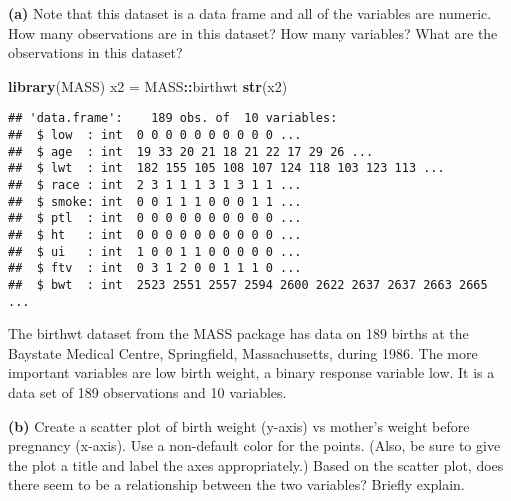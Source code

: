 \documentclass[]{article}
\newenvironment{Shaded}{\begin{snugshade}}{\end{snugshade}}
\newcommand{\DataTypeTok}[1]{\textcolor[rgb]{0.13,0.29,0.53}{#1}}
\newcommand{\KeywordTok}[1]{\textcolor[rgb]{0.13,0.29,0.53}{\textbf{#1}}}
\newcommand{\NormalTok}[1]{#1}
\newcommand{\OperatorTok}[1]{\textcolor[rgb]{0.81,0.36,0.00}{\textbf{#1}}}
\newcommand{\StringTok}[1]{\textcolor[rgb]{0.31,0.60,0.02}{#1}}
\begin{document}
\textbf{(a)} Note that this dataset is a data frame and all of the
variables are numeric. How many observations are in this dataset? How
many variables? What are the observations in this dataset?

\begin{Shaded}
\begin{Highlighting}[]
\KeywordTok{library}\NormalTok{(MASS)}
\NormalTok{x2 =}\StringTok{ }\NormalTok{MASS}\OperatorTok{::}\NormalTok{birthwt}
\KeywordTok{str}\NormalTok{(x2)}
\end{Highlighting}
\end{Shaded}

\begin{verbatim}
## 'data.frame':    189 obs. of  10 variables:
##  $ low  : int  0 0 0 0 0 0 0 0 0 0 ...
##  $ age  : int  19 33 20 21 18 21 22 17 29 26 ...
##  $ lwt  : int  182 155 105 108 107 124 118 103 123 113 ...
##  $ race : int  2 3 1 1 1 3 1 3 1 1 ...
##  $ smoke: int  0 0 1 1 1 0 0 0 1 1 ...
##  $ ptl  : int  0 0 0 0 0 0 0 0 0 0 ...
##  $ ht   : int  0 0 0 0 0 0 0 0 0 0 ...
##  $ ui   : int  1 0 0 1 1 0 0 0 0 0 ...
##  $ ftv  : int  0 3 1 2 0 0 1 1 1 0 ...
##  $ bwt  : int  2523 2551 2557 2594 2600 2622 2637 2637 2663 2665 ...
\end{verbatim}

The birthwt dataset from the MASS package has data on 189 births at the
Baystate Medical Centre, Springfield, Massachusetts, during 1986. The
more important variables are low birth weight, a binary response
variable low. It is a data set of 189 observations and 10 variables.

\textbf{(b)} Create a scatter plot of birth weight (y-axis) vs mother's
weight before pregnancy (x-axis). Use a non-default color for the
points. (Also, be sure to give the plot a title and label the axes
appropriately.) Based on the scatter plot, does there seem to be a
relationship between the two variables? Briefly explain.

\begin{Shaded}
\end{Shaded}
\end{document}

